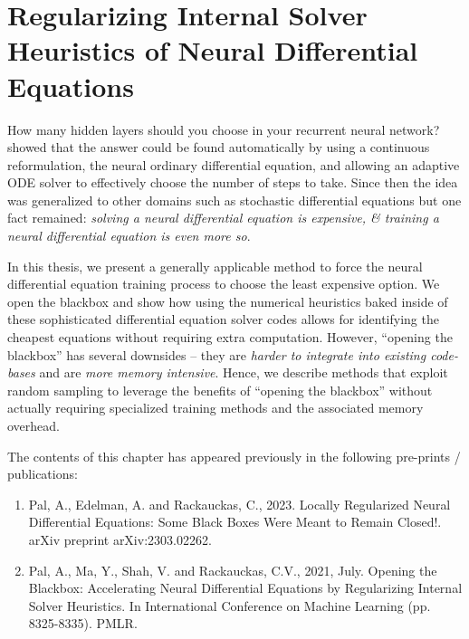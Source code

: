 \chapter[Regularizing Internal Solver Heuristics of Neural DEs]{Regularizing Internal Solver Heuristics of Neural Differential Equations}
\label{chapter:internal_solver_heuristics_regularized_neural_des}

How many hidden layers should you choose in your recurrent neural network? \citet{chen2018neural} showed that the answer could be found automatically by using a continuous reformulation, the neural ordinary differential equation, and allowing an adaptive ODE solver to effectively choose the number of steps to take. Since then the idea was generalized to other domains such as stochastic differential equations \citep{liu2019neural, rackauckas2020universal} but one fact remained: \textit{solving a neural differential equation is expensive, \& training a neural differential equation is even more so}.

In this thesis, we present a generally applicable method to force the neural differential equation training process to choose the least expensive option. We open the blackbox and show how using the numerical heuristics baked inside of these sophisticated differential equation solver codes allows for identifying the cheapest equations without requiring extra computation. However, ``opening the blackbox'' has several downsides -- they are \textit{harder to integrate into existing code-bases} and are \textit{more memory intensive}. Hence, we describe methods that exploit random sampling to leverage the benefits of ``opening the blackbox'' without actually requiring specialized training methods and the associated memory overhead.

The contents of this chapter has appeared previously in the following pre-prints / publications:
%
\begin{enumerate}
  \item \citep{pal2023locally} Pal, A., Edelman, A. and Rackauckas, C., 2023. Locally Regularized Neural Differential Equations: Some Black Boxes Were Meant to Remain Closed!. arXiv preprint arXiv:2303.02262.
  \item \citep{pal2021opening} Pal, A., Ma, Y., Shah, V. and Rackauckas, C.V., 2021, July. Opening the Blackbox: Accelerating Neural Differential Equations by Regularizing Internal Solver Heuristics. In International Conference on Machine Learning (pp. 8325-8335). PMLR.
\end{enumerate}
%

